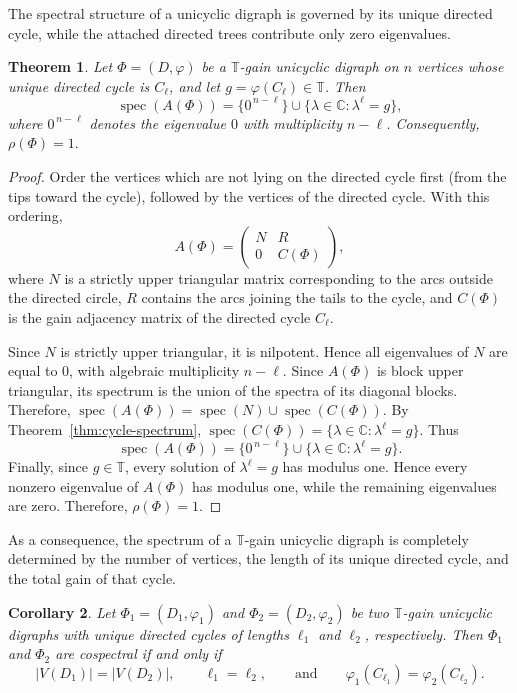 \documentclass[12pt]{article}
\newtheorem{theorem}{Theorem}[section]
\newtheorem{corollary}[theorem]{Corollary}
\theoremstyle{definition}
\newcommand{\TT}{\mathbb{T}}
\begin{document}
The spectral structure of a unicyclic digraph is governed by its unique directed cycle, while the attached directed trees contribute only zero eigenvalues.

\begin{theorem}
Let $\Phi=(D,\varphi)$ be a $\TT$-gain unicyclic digraph on $n$ vertices whose unique directed cycle is $C_\ell$, and let
$g=\varphi(C_\ell)\in\TT$.
Then
\[
\operatorname{spec}(A(\Phi))
=
\{0^{\,n-\ell}\}
\cup
\{\lambda\in\mathbb C:\lambda^\ell=g\},
\]
where $0^{\,n-\ell}$ denotes the eigenvalue $0$ with multiplicity
$n-\ell$. Consequently, $\rho(\Phi)=1.$
\end{theorem}

\begin{proof}
Order the vertices which are not lying on the directed cycle first (from the tips toward the cycle), followed by the vertices of the directed cycle.
With this ordering,
\[
A(\Phi)=
\begin{pmatrix}
N&R\\
0&C(\Phi)
\end{pmatrix},
\]
where $N$ is a strictly upper triangular matrix corresponding to the arcs outside the directed circle, $R$ contains the arcs joining the tails to the cycle, and $C(\Phi)$ is the gain adjacency matrix of the directed cycle
$C_\ell$.

Since $N$ is strictly upper triangular, it is nilpotent. Hence all
eigenvalues of $N$ are equal to $0$, with algebraic multiplicity
$n-\ell$. Since $A(\Phi)$ is block upper triangular, its spectrum is the union of the spectra of its diagonal blocks. Therefore,
$\operatorname{spec}(A(\Phi))
=
\operatorname{spec}(N)
\cup
\operatorname{spec}(C(\Phi))$.
By Theorem~\ref{thm:cycle-spectrum},
$\operatorname{spec}(C(\Phi))
=
\{\lambda\in\mathbb C:\lambda^\ell=g\}.$
Thus
\[
\operatorname{spec}(A(\Phi))
=
\{0^{\,n-\ell}\}
\cup
\{\lambda\in\mathbb C:\lambda^\ell=g\}.
\]
Finally, since $g\in\TT$, every solution of $\lambda^\ell=g$ has modulus one. Hence every nonzero eigenvalue of $A(\Phi)$ has modulus one, while the remaining eigenvalues are zero. Therefore,
$\rho(\Phi)=1.$
\end{proof}

As a consequence, the spectrum of a $\TT$-gain unicyclic digraph is completely determined by the number of vertices, the length of its unique directed cycle, and the total gain of that cycle.

\begin{corollary}
\label{cor:unicyclic-cospectral}
Let $\Phi_1=(D_1,\varphi_1)$ and $\Phi_2=(D_2,\varphi_2)$ be two
$\TT$-gain unicyclic digraphs with unique directed cycles of lengths
$\ell_1$ and $\ell_2$, respectively. Then $\Phi_1$ and $\Phi_2$ are
cospectral if and only if
\[
|V(D_1)|=|V(D_2)|,\qquad
\ell_1=\ell_2,
\qquad\text{and}\qquad
\varphi_1(C_{\ell_1})=\varphi_2(C_{\ell_2}).
\]
\end{corollary}
\end{document}
